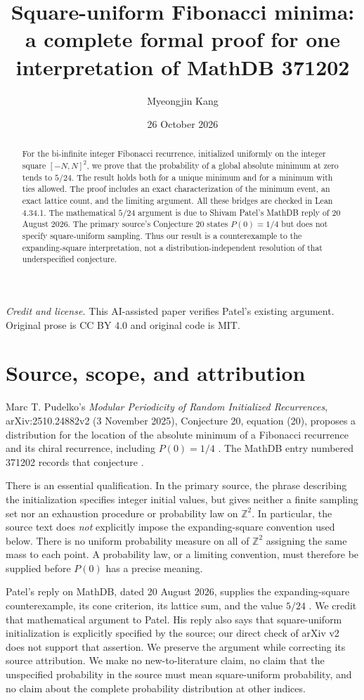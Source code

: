 \documentclass[11pt]{article}
\title{Square-uniform Fibonacci minima:\\a complete formal proof for one interpretation of MathDB 371202}
\author{Myeongjin Kang}
\date{26 October 2026}
\newcommand{\Z}{\mathbb Z}
\begin{document}
\maketitle
\begin{abstract}
For the bi-infinite integer Fibonacci recurrence, initialized uniformly on the integer square $[-N,N]^2$, we prove that the probability of a global absolute minimum at zero tends to $5/24$. The result holds both for a unique minimum and for a minimum with ties allowed. The proof includes an exact characterization of the minimum event, an exact lattice count, and the limiting argument. All these bridges are checked in Lean 4.34.1. The mathematical $5/24$ argument is due to Shivam Patel's MathDB reply of 20 August 2026. The primary source's Conjecture 20 states $P(0)=1/4$ but does not specify square-uniform sampling. Thus our result is a counterexample to the expanding-square interpretation, not a distribution-independent resolution of that underspecified conjecture.
\end{abstract}

\noindent\textit{Credit and license.} This AI-assisted paper verifies Patel's existing argument. Original prose is CC BY 4.0 and original code is MIT.

\section{Source, scope, and attribution}
Marc T. Pudelko's \emph{Modular Periodicity of Random Initialized Recurrences}, arXiv:2510.24882v2 (3 November 2025), Conjecture 20, equation (20), proposes a distribution for the location of the absolute minimum of a Fibonacci recurrence and its chiral recurrence, including $P(0)=1/4$ \cite{pudelko}. The MathDB entry numbered 371202 records that conjecture \cite{mathdb}.

There is an essential qualification. In the primary source, the phrase describing the initialization specifies integer initial values, but gives neither a finite sampling set nor an exhaustion procedure or probability law on $\Z^2$. In particular, the source text does \emph{not} explicitly impose the expanding-square convention used below. There is no uniform probability measure on all of $\Z^2$ assigning the same mass to each point. A probability law, or a limiting convention, must therefore be supplied before $P(0)$ has a precise meaning.

Patel's reply on MathDB, dated 20 August 2026, supplies the expanding-square counterexample, its cone criterion, its lattice sum, and the value $5/24$ \cite{patel}. We credit that mathematical argument to Patel. His reply also says that square-uniform initialization is explicitly specified by the source; our direct check of arXiv v2 does not support that assertion. We preserve the argument while correcting its source attribution. We make no new-to-literature claim, no claim that the unspecified probability in the source must mean square-uniform probability, and no claim about the complete probability distribution at other indices.
\end{document}

